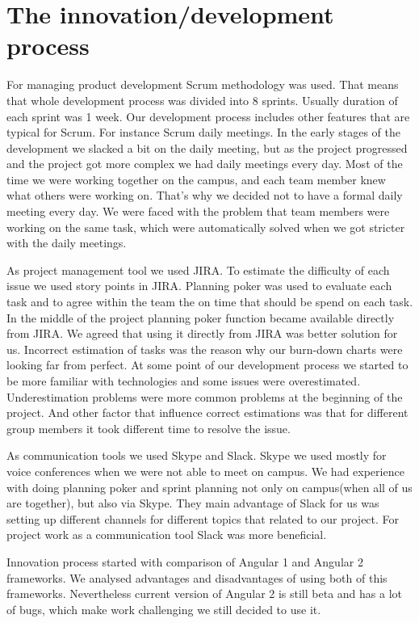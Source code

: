 \section {The innovation/development process}
For managing product development Scrum methodology was used. That means that whole development process was divided into 8 sprints. Usually duration of each sprint was 1 week. Our development process includes other features that are typical for Scrum. For instance Scrum daily meetings. In the early stages of the development we slacked a bit on the daily meeting, but as the project progressed and the project got more complex we had daily meetings every day. Most of the time we were working together on the campus, and each team member knew what others were working on. That's why we decided not to have a formal daily meeting every day. We were faced with the problem that team members were working on the same task, which were automatically solved when we got stricter with the daily meetings.
\par
As project management tool we used JIRA. To estimate the difficulty of each issue we used story points in JIRA. Planning poker was used to evaluate each task and to agree within the team the on time that should be spend on each task. In the middle of the project planning poker function became available directly from JIRA. We agreed that using it directly from JIRA was better solution for us. Incorrect estimation of tasks was the reason why our burn-down charts were looking far from perfect. At some point of our development process we started to be more familiar with technologies and some issues were overestimated. Underestimation problems were more common problems at the beginning of the project. And other factor that influence correct estimations was that for different group members it took different time to resolve the issue.
\par
As communication tools we used Skype and Slack. Skype we used mostly for voice conferences when we were not able to meet on campus. We had experience with doing planning poker and sprint planning not only on campus(when all of us are together), but also via Skype. They main advantage of Slack for us was setting up different channels for different topics that related to our project. For project work as a communication tool Slack was more beneficial.
\par
Innovation process started with comparison of Angular 1 and Angular 2 frameworks. We analysed advantages and disadvantages of using both of this frameworks. Nevertheless current version of Angular 2 is still beta and has a lot of bugs, which make work challenging we still decided to use it. 




